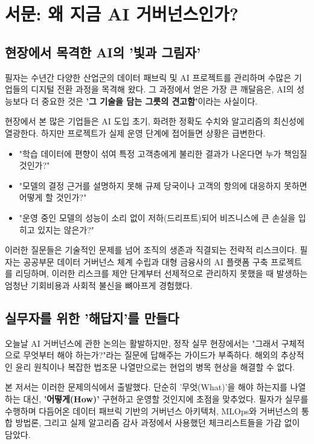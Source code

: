 \chapter*{서문: 왜 지금 AI 거버넌스인가?}

\section*{현장에서 목격한 AI의 '빛과 그림자'}

필자는 수년간 다양한 산업군의 데이터 패브릭 및 AI 프로젝트를 관리하며 수많은 기업들의 디지털 전환 과정을 목격해 왔다. 그 과정에서 얻은 가장 큰 깨달음은, AI의 성능보다 더 중요한 것은 \textbf{'그 기술을 담는 그릇의 견고함'}이라는 사실이다.

현장에서 본 많은 기업들은 AI 도입 초기, 화려한 정확도 수치와 알고리즘의 최신성에 열광한다. 하지만 프로젝트가 실제 운영 단계에 접어들면 상황은 급변한다. 
\begin{itemize}
    \item "학습 데이터에 편향이 섞여 특정 고객층에게 불리한 결과가 나온다면 누가 책임질 것인가?"
    \item "모델의 결정 근거를 설명하지 못해 규제 당국이나 고객의 항의에 대응하지 못하면 어떻게 할 것인가?"
    \item "운영 중인 모델의 성능이 소리 없이 저하(드리프트)되어 비즈니스에 큰 손실을 입히고 있지는 않은가?"
\end{itemize}

이러한 질문들은 기술적인 문제를 넘어 조직의 생존과 직결되는 전략적 리스크이다. 필자는 공공부문 데이터 거버넌스 체계 수립과 대형 금융사의 AI 플랫폼 구축 프로젝트를 리딩하며, 이러한 리스크를 제안 단계부터 선제적으로 관리하지 못했을 때 발생하는 엄청난 기회비용과 사회적 불신을 뼈아프게 경험했다.

\section*{실무자를 위한 '해답지'를 만들다}

오늘날 AI 거버넌스에 관한 논의는 활발하지만, 정작 실무 현장에서는 "그래서 구체적으로 무엇부터 해야 하는가?"라는 질문에 답해주는 가이드가 부족하다. 해외의 추상적인 윤리 원칙이나 복잡한 법조문 나열만으로는 현업의 병목 현상을 해결할 수 없다.

본 저서는 이러한 문제의식에서 출발했다. 단순히 '무엇(What)'을 해야 하는지를 나열하는 대신, \textbf{'어떻게(How)'} 구현하고 운영할 것인지에 초점을 맞추었다. 필자가 실무를 수행하며 다듬어온 데이터 패브릭 기반의 거버넌스 아키텍처, MLOps와 거버넌스의 통합 방법론, 그리고 실제 알고리즘 감사 과정에서 사용했던 체크리스트들을 가감 없이 담았다.

